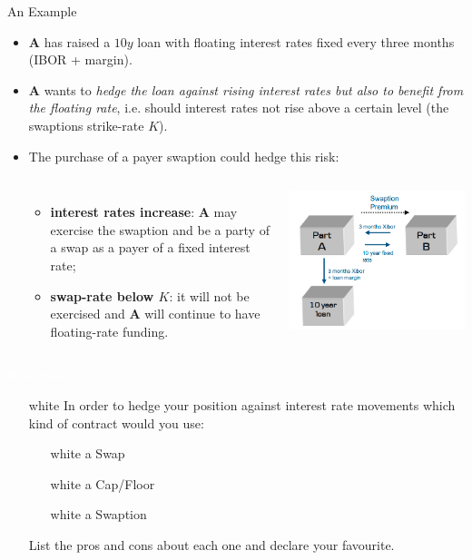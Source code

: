 \documentclass{beamer}
\begin{document}
\begin{frame}{An Example}
	\begin{itemize}
		\item \textbf{A} has raised a $10y$ loan with floating interest rates fixed every three months (IBOR + margin).
		\item \textbf{A} wants to \emph{hedge the loan against rising interest rates but also to benefit from the floating rate}, i.e. should interest rates not rise above a certain level (the swaptions strike-rate $K$).
		\item The purchase of a payer swaption could hedge this risk: 
		\begin{columns}
			\begin{itemize}
				\item \textbf{interest rates increase}: \textbf{A} may exercise the swaption and be a party of a swap as a payer of a fixed interest rate;
				\item \textbf{swap-rate below $K$}: it will not be exercised and \textbf{A} will continue to have floating-rate funding.
			\end{itemize}
			\includegraphics[width=1.\linewidth]{images/swaption_example}
		\end{columns}
	\end{itemize}
\end{frame}

\begin{homework}
\begin{frame}{\textcolor{white}{Homework}}
\begin{itemize}
\item[white] In order to hedge your position against interest rate movements which kind of contract would you use: 
\begin{itemize}
\item[white] a Swap
\item[white] a Cap/Floor
\item[white] a Swaption
\end{itemize}
List the pros and cons about each one and declare your favourite.
\end{itemize}
\end{frame}
\end{homework}
\end{document}
